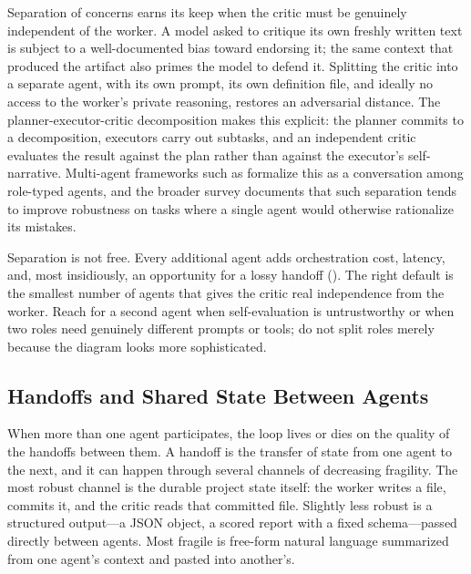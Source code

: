 Separation of concerns earns its keep when the critic must be genuinely independent of the worker. A model asked to critique its own freshly written text is subject to a well-documented bias toward endorsing it; the same context that produced the artifact also primes the model to defend it. Splitting the critic into a separate agent, with its own prompt, its own definition file, and ideally no access to the worker's private reasoning, restores an adversarial distance. The planner-executor-critic decomposition makes this explicit: the planner commits to a decomposition, executors carry out subtasks, and an independent critic evaluates the result against the plan rather than against the executor's self-narrative. Multi-agent frameworks such as \cite{wu2023autogen} formalize this as a conversation among role-typed agents, and the broader survey \cite{xi2023rise} documents that such separation tends to improve robustness on tasks where a single agent would otherwise rationalize its mistakes.

\begin{remark}
Separation is not free. Every additional agent adds orchestration cost, latency, and, most insidiously, an opportunity for a lossy handoff (). The right default is the smallest number of agents that gives the critic real independence from the worker. Reach for a second agent when self-evaluation is untrustworthy or when two roles need genuinely different prompts or tools; do not split roles merely because the diagram looks more sophisticated.
\end{remark}

\subsection{Handoffs and Shared State Between Agents}\label{subsec:agent-handoffs}

When more than one agent participates, the loop lives or dies on the quality of the handoffs between them. A handoff is the transfer of state from one agent to the next, and it can happen through several channels of decreasing fragility. The most robust channel is the durable project state itself: the worker writes a file, commits it, and the critic reads that committed file. Slightly less robust is a structured output---a JSON object, a scored report with a fixed schema---passed directly between agents. Most fragile is free-form natural language summarized from one agent's context and pasted into another's.

